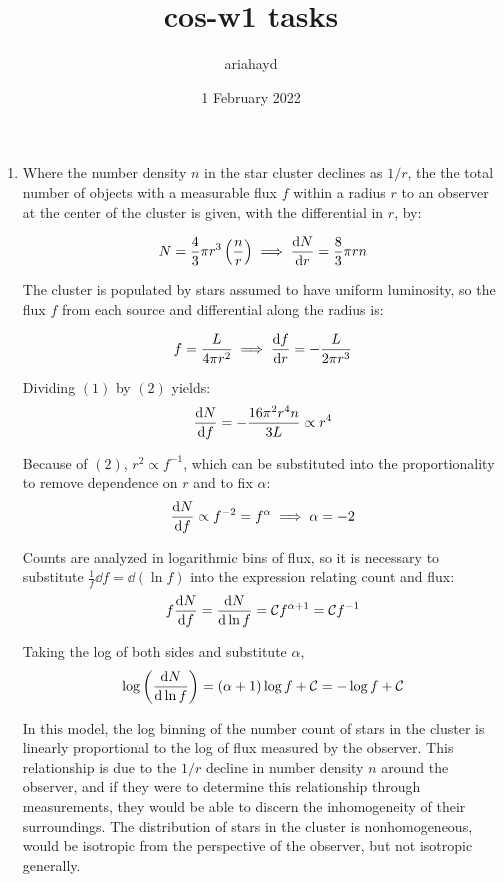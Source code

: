 \documentclass{paper}
\title{cos-w1 tasks}
\author{ariahayd}
\date{1 February 2022}
\begin{document}
 

\maketitle

\begin{enumerate}
    \item %
      Where the number density $n$ in the star cluster declines as 
      $1/r$, the the total number of objects with a measurable flux 
      $f$ within a radius $r$ to an observer at the center of the cluster 
      is given, with the differential in $r$, by: 

      \begin{equation}
        N = \frac{4}{3} \pi r^3 \left( \frac{n}{r} \right) \implies 
        \dv{N}{r} = \frac{8}{3} \pi r n
      \end{equation}

      The cluster is populated by stars assumed to have uniform luminosity, 
      so the flux $f$ from each source and differential along the radius is:

      \begin{equation}
        f = \frac{L}{4 \pi r^2} \implies \dv{f}{r} = -\frac{L}{2 \pi r^3}
      \end{equation}

      Dividing $(1)$ by $(2)$ yields:
      \[ \dv{N}{f} = -\frac{16 \pi^2 r^4 n }{3 L} \propto r^4 \]

      Because of $(2)$, $r^2 \propto f^{-1}$, which can be substituted into 
      the proportionality to remove dependence on $r$ and to fix $\alpha$:
      \[  \dv{N}{f} \propto f^{-2} = f^{\alpha} \implies \alpha = -2 \]

      Counts are analyzed in logarithmic bins of flux, so it is necessary to
      substitute $\frac{1}{f}\dd{f} = \dd{(\ln{f})}$ into the expression 
      relating count and flux:
      \[ f \dv{N}{f} = \dv{N}{\ln{f}}
      = \mathcal{C} f^{\alpha + 1} = \mathcal{C} f^{-1} \]

      Taking the log of both sides and substitute $\alpha$,
      \[ \log{\left(\dv{N}{\ln{f}}\right)} = (\alpha + 1)\log{f} + \mathcal{C}
      = -\log{f} + \mathcal{C} \]

      In this model, the log binning of the number count of stars in the
      cluster is linearly proportional to the log of flux measured by
      the observer. This relationship is due to the $1/r$ decline in number
      density $n$ around the observer, and if they were to determine this
      relationship through measurements, they would be able to discern the
      inhomogeneity of their surroundings. The distribution of stars in the
      cluster is nonhomogeneous, would be isotropic from the perspective of 
      the observer, but not isotropic generally.


\end{enumerate}
\end{document}
